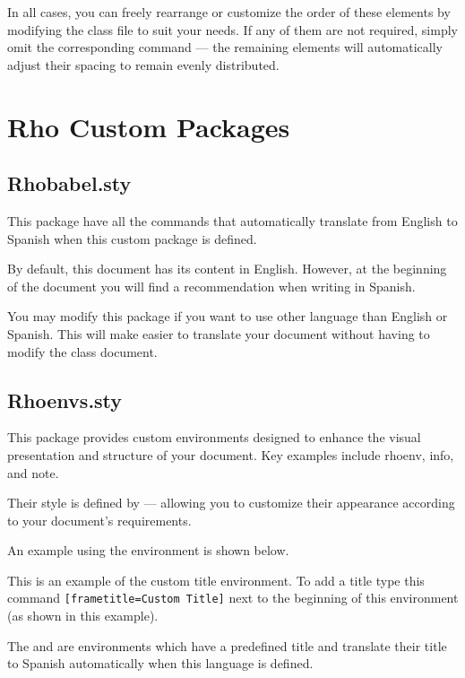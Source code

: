 \documentclass[9pt,a4paper,twocolumn,twoside]{rho-class/rho}
\begin{document}
             In all cases, you can freely rearrange or customize the order of these elements by modifying the class file to suit your needs. If any of them are not required, simply omit the corresponding command — the remaining elements will automatically adjust their spacing to remain evenly distributed.

\section{Rho Custom Packages}

    \subsection{Rhobabel.sty}
		
		This package have all the commands that automatically translate from English to Spanish when this custom package is defined. 
		
		By default, this document has its content in English. However, at the beginning of the document you will find a recommendation when writing in Spanish. 
		
		You may modify this package if you want to use other language than English or Spanish. This will make easier to translate your document without having to modify the class document.

    \subsection{Rhoenvs.sty}

        This package provides custom environments designed to enhance the visual presentation and structure of your document. Key examples include rhoenv, info, and note.
        
		Their style is defined by  — allowing you to customize their appearance according to your document’s requirements.

		An example using the  environment is shown below.
		
		\begin{rhoenv}[frametitle=Custom Title]
			This is an example of the custom title environment. To add a title type this command \verb|[frametitle=Custom Title]| next to the beginning of this environment (as shown in this example).
		\end{rhoenv}

        The  and  are environments which have a predefined title and translate their title to Spanish automatically when this language is defined.
\end{document}
